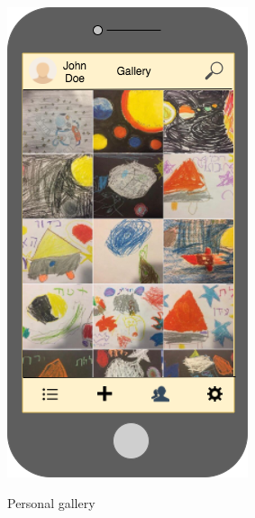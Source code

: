 \begin{figure}[H]
  \hspace{1cm}
  \begin{minipage}[b]{0.31\linewidth}
    \caption{Personal gallery}
    \includegraphics[width=\linewidth]{Appendix/HorizontalPrototype/2.png}
    \label{PersonalGallery}
  \end{minipage}
\end{figure}

